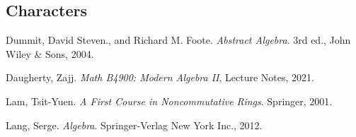 \documentclass[11pt, reqno]{amsart}
\theoremstyle{plain}
\theoremstyle{definition}
\theoremstyle{example}
\begin{document}
\subsection{Characters}






\newpage
\begin{thebibliography}{9}

Dummit, David Steven., and Richard M. Foote. \textit{Abstract Algebra}. 3rd ed., John Wiley \& Sons, 2004. 

Daugherty, Zajj. \textit{Math B4900: Modern Algebra II}, Lecture Notes, 2021.

Lam, Tsit-Yuen. \textit{A First Course in Noncommutative Rings}. Springer, 2001. 

Lang, Serge. \textit{Algebra}. Springer-Verlag New York Inc., 2012. 

\end{thebibliography}
\end{document}
